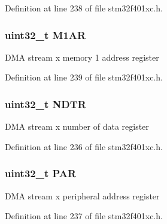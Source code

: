 Definition at line 238 of file stm32f401xc.\+h.

\subsubsection[{\texorpdfstring{M1\+AR}{M1AR}}]{ uint32\+\_\+t M1\+AR}\hypertarget{struct_d_m_a___stream___type_def_aee7782244ceb4791d9a3891804ac47ac}{}\label{struct_d_m_a___stream___type_def_aee7782244ceb4791d9a3891804ac47ac}
D\+MA stream x memory 1 address register 

Definition at line 239 of file stm32f401xc.\+h.

\subsubsection[{\texorpdfstring{N\+D\+TR}{NDTR}}]{ uint32\+\_\+t N\+D\+TR}\hypertarget{struct_d_m_a___stream___type_def_af60258ad5a25addc1e8969665d0c1731}{}\label{struct_d_m_a___stream___type_def_af60258ad5a25addc1e8969665d0c1731}
D\+MA stream x number of data register 

Definition at line 236 of file stm32f401xc.\+h.

\subsubsection[{\texorpdfstring{P\+AR}{PAR}}]{ uint32\+\_\+t P\+AR}\hypertarget{struct_d_m_a___stream___type_def_aef55be3d948c22dd32a97e8d4f8761fd}{}\label{struct_d_m_a___stream___type_def_aef55be3d948c22dd32a97e8d4f8761fd}
D\+MA stream x peripheral address register 

Definition at line 237 of file stm32f401xc.\+h.



